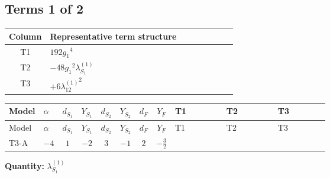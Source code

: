 \documentclass[8pt]{article}
\begin{document}
\begin{landscape}
\subsection*{Terms 1 of 2}
\begin{center}
\begin{tabular}{@{}c >{\raggedright\arraybackslash}p{0.82\linewidth}@{}}
\toprule
Column & Representative term structure \\
\midrule
T1 & \(\displaystyle 192 {g_1}^4\) \\
\midrule
T2 & \(\displaystyle -48 {g_1}^2 {\lambda_{S_1}^{(1)}}\) \\
\midrule
T3 & \(\displaystyle +6 {\lambda_{12}^{(1)}}^2\) \\
\midrule
\bottomrule
\end{tabular}
\end{center}
\smallskip
\tiny
\begin{longtable}{@{}llcccccc >{\raggedright\arraybackslash}p{0.21\linewidth} >{\raggedright\arraybackslash}p{0.21\linewidth} >{\raggedright\arraybackslash}p{0.21\linewidth}@{}}
\toprule
Model & $\alpha$ & $d_{S_1}$ & $Y_{S_1}$ & $d_{S_2}$ & $Y_{S_2}$ & $d_F$ & $Y_F$ & T1 & T2 & T3 \\
\midrule
\endfirsthead
\toprule
Model & $\alpha$ & $d_{S_1}$ & $Y_{S_1}$ & $d_{S_2}$ & $Y_{S_2}$ & $d_F$ & $Y_F$ & T1 & T2 & T3 \\
\midrule
\endhead
T3-A & $-4$ & $1$ & $-2$ & $3$ & $-1$ & $2$ & $-\frac{3}{2}$ & \scriptsize\adjustbox{max width=\linewidth}{$\begin{gathered} 192 {g_1}^4\end{gathered}$} & \scriptsize\adjustbox{max width=\linewidth}{$\begin{gathered} -48 {g_1}^2 {\lambda_{S_1}^{(1)}}\end{gathered}$} & \scriptsize\adjustbox{max width=\linewidth}{$\begin{gathered} +6 {\lambda_{12}^{(1)}}^2\end{gathered}$} \\
\midrule
\bottomrule
\end{longtable}
\clearpage
\noindent\textbf{Quantity: }$\lambda_{S_1}^{(1)}$\par\smallskip

\end{landscape}
\end{document}
